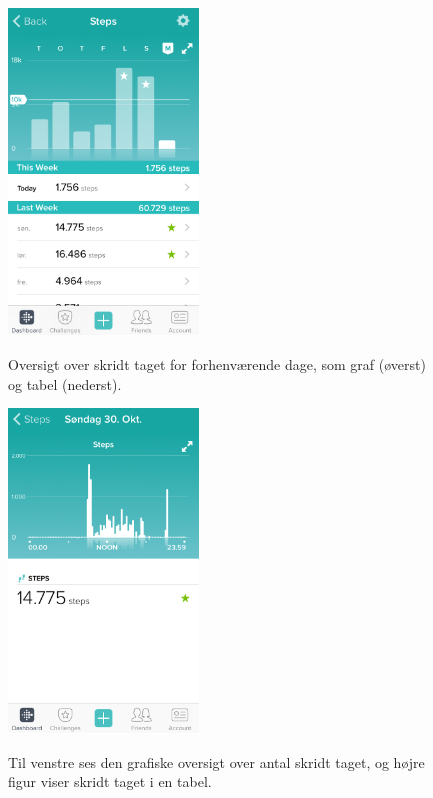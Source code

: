 \begin{figure}[H]
	\centering
	\begin{minipage}[t]{0.45\textwidth}
		\label{fig:brugerfladesteps}
	    \includegraphics[width=0.45\textwidth]{figures/brugerfladesteps}
		\flushleft
		\caption{Oversigt over skridt taget for forhenværende dage, som graf (øverst) og tabel (nederst).}
	\end{minipage}
	\hfill
	\begin{minipage}[t]{0.45\textwidth}
		\label{fig:specifiksteps}
		\centering
		\includegraphics[width=0.45\textwidth]{figures/specifiksteps}
		\flushleft
		\vspace{12pt}
		\caption{Til venstre ses den grafiske oversigt over antal skridt taget, og højre figur viser skridt taget i en tabel.}
	\end{minipage}
\end{figure}

